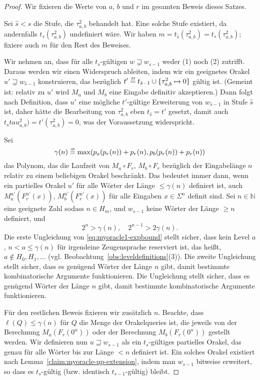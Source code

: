 \begin{proof}
Wir fixieren die Werte von $a$, $b$ und $r$ im gesamten Beweis dieses Satzes.

Sei $\hat{s} < s$ die Stufe, die $\tau^2_{a,b}$ behandelt hat.
Eine solche Stufe existiert, da andernfalls $t_{s}(\tau^2_{a,b})$ undefiniert wäre.
Wir haben $m = t_{\hat{s}}(\tau^2_{a,b}) = t_{s}(\tau^2_{a,b})$; fixiere auch $m$ für den Rest des Beweises.

Wir nehmen an, dass für alle $t_{s}$-gültigen $w\sqsupsetneq w_{s-1}$ weder (1) noch (2) zutrifft.
Daraus werden wir einen Widerspruch ableiten, indem wir ein geeignetes Orakel $u'\sqsupsetneq w_{\hat{s}-1}$ konstruieren, das bezüglich $t' \stackrel{\text{\smash{\tiny df}}}{=}  t_{\hat{s}-1}\cup \{\tau^2_{a,b}\mapsto 0\}$ gültig ist. (Gemeint ist: relativ zu $u'$ wird $M_a$ und $M_b$ eine Eingabe definitiv akzeptieren.)
Dann folgt nach Definition, dass $u'$ eine mögliche $t'$-gültige Erweiterung von $w_{\hat{s}-1}$ in Stufe $\hat{s}$ ist, daher hätte die Bearbeitung von $\tau^2_{a,b}$ eben $t_{\hat{s}}=t'$ gesetzt, damit auch $t_{s}tau^2_{a,b})=t'(\tau^2_{a,b})=0$, was der Voraussetzung widerspricht.

Sei
\begin{equation*} \gamma(n) \stackrel{\text{\smash{\tiny df}}}{=}  \max(p_a(p_r(n))+p_r(n), p_b(p_r(n))+p_r(n)) \end{equation*}
das Polynom, das die Laufzeit von $M_a\circ F_r$, $M_b\circ F_r$ bezüglich der Eingabelänge $n$ relativ zu einem beliebigen Orakel beschränkt.
Das bedeutet immer dann, wenn ein partielles Orakel $u'$ für alle Wörter der Länge $\leq \gamma(n)$ definiert ist, auch $M_a^{u'}(F_r^{u'}(x))$, $M_b^{u'}(F_r^{u'}(x))$ für alle Eingaben $x\in\Sigma^n$ definit sind.
Sei $n\in\mathbb N$ eine geeignete Zahl sodass $n\in H_m$, und $w_{s-1}$ keine Wörter der Länge $\geq n$ definiert,
und
\begin{equation}\label{eq:myoracle1-expbound}
    2^n > \gamma(n),\quad  2^{n-1} > 2\gamma(n).
\end{equation}
Die erste Ungleichung von \eqref{eq:myoracle1-expbound} stellt sicher, dass kein Level $a$, $n<a\leq \gamma(n)$ für irgendeine Zeugensprache reserviert ist, das heißt, $a\not\in H_0, H_1, \dots$ (vgl. Beobachtung~\ref{obs:leveldefinitions}(3)). Die zweite Ungleichung stellt sicher, dass es genügend Wörter der Länge $n$ gibt, damit bestimmte kombinatorische Argumente funktionieren.
Die Ungleichung stellt sicher, dass es genügend Wörter der Länge $n$ gibt, damit bestimmte kombinatorische Argumente funktionieren.

Für den restlichen Beweis fixieren wir zusätzlich $n$.
Beachte, dass $\ell(Q)\leq\gamma(n)$ für $Q$ die Menge der Orakelqueries ist, die jeweils von der Berechnung $M_a(F_r(0^n))$ oder der Berechnung $M_b(F_r(0^n))$ gestellt werden.
Wir definieren nun $u\sqsupseteq w_{s-1}$ als ein $t_{s}$-gültiges partielles Orakel, das genau für alle Wörter bis zur Länge $<n$ definiert ist. Ein solches Orakel existiert nach Lemma~\ref{claim:myoracle-up-extension}, indem man $w_{s-1}$ bitweise erweitert, so dass es $t_{s}$-gültig (bzw. identisch $t_{s-1}$-gültig) bleibt.


\end{proof}
